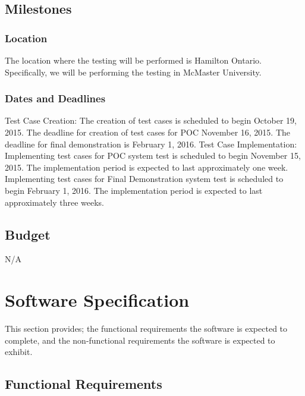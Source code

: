 \documentclass[12pt]{article}
\begin{document}
\subsection{Milestones}

\subsubsection{Location}
The location where the testing will be performed is Hamilton Ontario. Specifically, we will be performing the testing in McMaster University. 


\subsubsection{Dates and Deadlines}

Test Case Creation:
The creation of test cases is scheduled to begin October 19, 2015. The deadline for creation of test cases for POC November 16, 2015. The deadline for final demonstration is February 1, 2016.
\newline
\newline
Test Case Implementation:
Implementing test cases for POC system test is scheduled to begin November 15, 2015. The implementation period is expected to last approximately one week. 
\newline
\newline
Implementing test cases for Final Demonstration system test is scheduled to begin February 1, 2016. The implementation period is expected to last approximately three weeks. 


\subsection{Budget}
N/A

%
%

\section{ Software Specification}
This section provides; the functional requirements the 
software is expected to complete, and the non-functional requirements the software is expected to exhibit.

\subsection{Functional Requirements}
\end{document}

